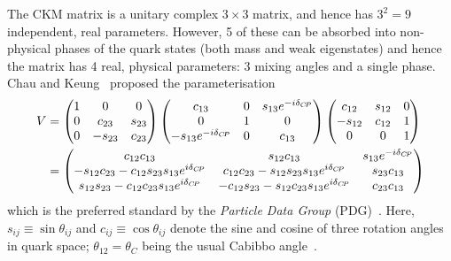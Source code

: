 The CKM matrix is a unitary complex $3\times3$ matrix, and hence has $3^2=9$ independent, real parameters. However, 5 of these can be absorbed into non-physical phases of the quark states (both mass and weak eigenstates) and hence the matrix has 4 real, physical parameters: 3 mixing angles and a single phase. Chau and Keung~\cite{chauCommentsParametrizationKobayashiMaskawa1984} proposed the parameterisation
\begin{align}
\begin{split}\label{eq:CK_CKM_matrix}
        V &= 
        \begin{pmatrix}
            1 & 0 & 0 \\ 0 & c_{23} & s_{23} \\ 0 & -s_{23} & c_{23}
        \end{pmatrix}
        \begin{pmatrix}
            c_{13} & 0 & s_{13}e^{-i\delta_{{C\!P}}} \\ 0 & 1 & 0 \\ -s_{13}e^{-i\delta_{{C\!P}}} & 0 & c_{13}
        \end{pmatrix}
        \begin{pmatrix}
            c_{12} & s_{12}  & 0 \\ -s_{12} & c_{12} & 1 \\ 0 & 0 & 1
        \end{pmatrix}
        \\
        &=
        \begin{pmatrix}
            c_{12}c_{13} & s_{12}c_{13} & s_{13}e^{-i\delta_{{C\!P}}} \\
            -s_{12}c_{23}-c_{12}s_{23}s_{13}e^{i\delta_{{C\!P}}} &
            c_{12}c_{23}-s_{12}s_{23}s_{13}e^{i\delta_{{C\!P}}} &
            s_{23}c_{13} \\
            s_{12}s_{23}-c_{12}c_{23}s_{13}e^{i\delta_{{C\!P}}} &
            -c_{12}s_{23}-s_{12}c_{23}s_{13}e^{i\delta_{{C\!P}}} &
            c_{23}c_{13} \\
        \end{pmatrix}
\end{split}
\end{align}
which is the preferred standard by the \emph{Particle Data Group} (PDG)~\cite{PDG2020}. Here, $s_{ij}\equiv\sin \theta_{ij}$ and $c_{ij}\equiv\cos \theta_{ij}$ denote the sine and cosine of three rotation angles in quark space; $\theta_{12}=\theta_C$ being the usual Cabibbo angle~\cite{cabibboUnitarySymmetryLeptonic1963}.

